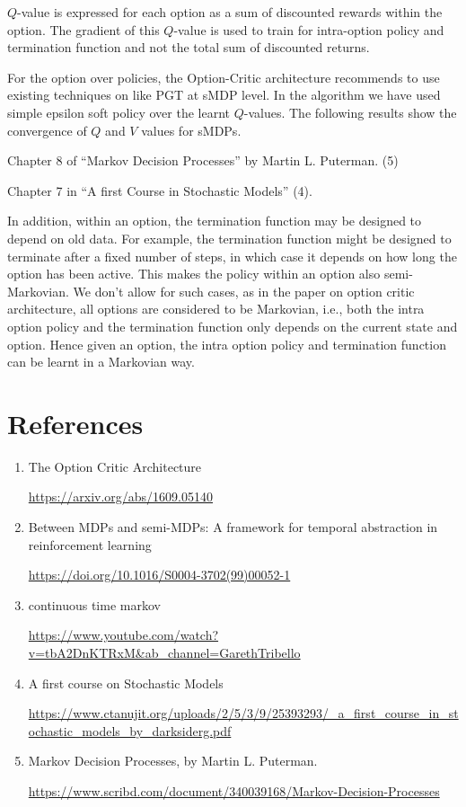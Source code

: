 \( Q \)-value is expressed for each option as a sum of discounted rewards within the option.
The gradient of this \( Q \)-value is used to train for intra-option policy and termination function and not the total sum of discounted returns.

For the option over policies, the Option-Critic architecture recommends to use existing techniques on like PGT at sMDP level.
In the algorithm we have used simple epsilon soft policy over the learnt \( Q \)-values.
The following results show the convergence of \( Q \) and \( V \) values for sMDPs.

Chapter 8 of ``Markov Decision Processes'' by Martin L. Puterman. (5)

Chapter 7 in ``A first Course in Stochastic Models'' (4).

In addition, within an option, the termination function may be designed to depend on old data.
For example, the termination function might be designed to terminate after a fixed number of steps, in which case it depends on how long the option has been active.
This makes the policy within an option also semi-Markovian.
We don't allow for such cases, as in the paper on option critic architecture, all options are considered to be Markovian, i.e., both the intra option policy and the termination function only depends on the current state and option.
Hence given an option, the intra option policy and termination function can be learnt in a Markovian way.


\section{References}

\begin{enumerate}
      \item The Option Critic Architecture

            \url{https://arxiv.org/abs/1609.05140}


      \item Between MDPs and semi-MDPs: A framework for temporal abstraction in reinforcement learning

            \url{https://doi.org/10.1016/S0004-3702(99)00052-1}


      \item continuous time markov

            \url{https://www.youtube.com/watch?v=tbA2DnKTRxM&ab_channel=GarethTribello}


      \item A first course on Stochastic Models

            \url{https://www.ctanujit.org/uploads/2/5/3/9/25393293/_a_first_course_in_stochastic_models_by_darksiderg.pdf}

      \item Markov Decision Processes, by Martin L. Puterman.

            \url{https://www.scribd.com/document/340039168/Markov-Decision-Processes}

\end{enumerate}
